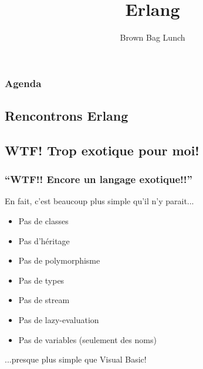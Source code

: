 \documentclass[notes=only]{beamer}
\title{Erlang}
\author{Brown Bag Lunch}\institute{Bernard Notarianni}
\begin{document}
\begin{frame}

  \titlepage

\end{frame}

\begin{frame}
  \frametitle{Agenda}
  \tableofcontents
\end{frame}

\begin{frame}
  \section[Rencontre]{Rencontrons Erlang}
  \subsection[WTF]{WTF! Trop exotique pour moi!}


  \frametitle{``WTF!! Encore un langage exotique!!''}
  En fait, c'est beaucoup plus simple qu'il n'y parait...
  \begin{itemize}
  \item Pas de classes
  \item Pas d'héritage
  \item Pas de polymorphisme
  \item Pas de types
  \item Pas de stream
  \item Pas de lazy-evaluation
  \item Pas de variables (seulement des noms)
  \end{itemize}
  ...presque plus simple que Visual Basic!

\end{frame}
\end{document}

